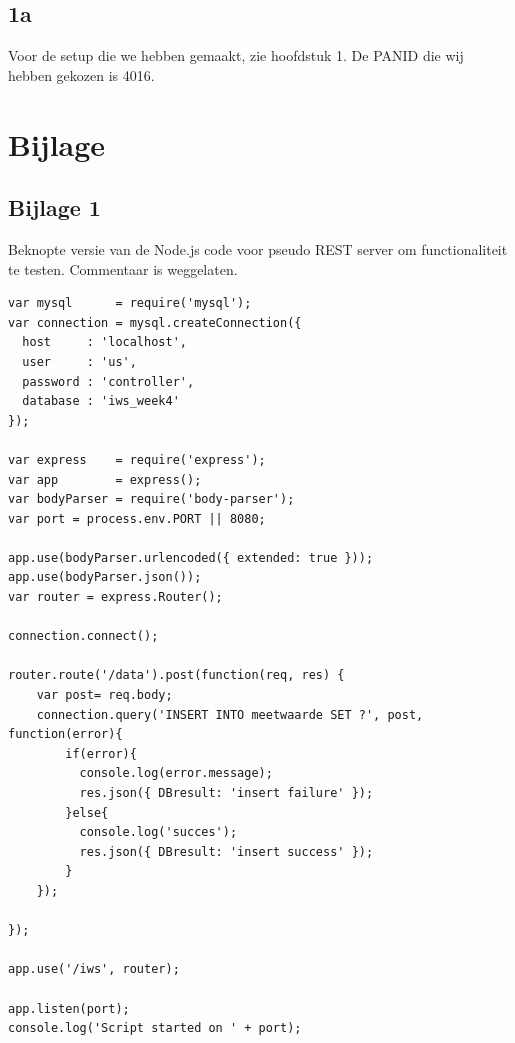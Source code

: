 \documentclass[12pt]{article}
\begin{document}
\subsection*{1a}
Voor de setup die we hebben gemaakt, zie hoofdstuk 1. De PANID die wij hebben gekozen is 4016.
\section{Bijlage}
\subsection*{Bijlage 1}
Beknopte versie van de Node.js code voor pseudo REST server om functionaliteit te testen. Commentaar is weggelaten.
\begin{lstlisting}
var mysql      = require('mysql');
var connection = mysql.createConnection({
  host     : 'localhost',
  user     : 'us',
  password : 'controller',
  database : 'iws_week4'
});

var express    = require('express');
var app        = express();  
var bodyParser = require('body-parser');
var port = process.env.PORT || 8080;

app.use(bodyParser.urlencoded({ extended: true }));
app.use(bodyParser.json()); 
var router = express.Router(); 

connection.connect();

router.route('/data').post(function(req, res) {
    var post= req.body;
	connection.query('INSERT INTO meetwaarde SET ?', post, function(error){
	    if(error){
	      console.log(error.message);
	      res.json({ DBresult: 'insert failure' });
	    }else{
	      console.log('succes');
	      res.json({ DBresult: 'insert success' });
	    }
  	});
	
});

app.use('/iws', router);

app.listen(port);
console.log('Script started on ' + port);
\end{lstlisting}
\end{document}

